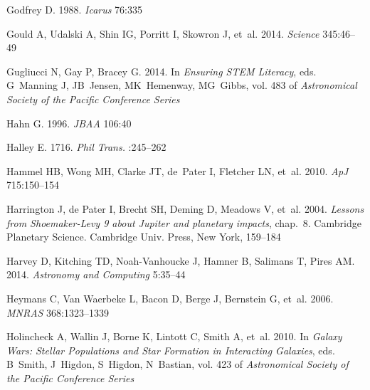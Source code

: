 \documentclass{ar2e}
\def\mnras{MNRAS}
\begin{document}
\begin{thebibliography}{}
{Godfrey} D. 1988.
\newblock \textit{{Icarus}} 76:335

{Gould} A, {Udalski} A, {Shin} IG, {Porritt} I, {Skowron} J, et~al. 2014.
\newblock \textit{Science} 345:46--49

{Gugliucci} N, {Gay} P, {Bracey} G. 2014.
\newblock In \textit{Ensuring STEM Literacy}, eds. G~{Manning} J, JB~{Jensen},
  MK~{Hemenway}, MG~{Gibbs}, vol. 483 of \textit{Astronomical Society of the
  Pacific Conference Series}

{Hahn} G. 1996.
\newblock \textit{{JBAA}} 106:40

{Halley} E. 1716.
\newblock \textit{Phil Trans.} :245--262

Hammel HB, Wong MH, Clarke JT, de~Pater I, Fletcher LN, et~al. 2010.
\newblock \textit{ApJ} 715:150--154

{Harrington} J, {de Pater} I, {Brecht} SH, {Deming} D, {Meadows} V, et~al.
  2004.
\newblock \textit{{Lessons from Shoemaker-Levy 9 about Jupiter and planetary
  impacts}}, chap.~8.
\newblock Cambridge Planetary Science. Cambridge Univ. Press, New York,
  159--184

{Harvey} D, {Kitching} TD, {Noah-Vanhoucke} J, {Hamner} B, {Salimans} T,
  {Pires} AM. 2014.
\newblock \textit{Astronomy and Computing} 5:35--44

{Heymans} C, {Van Waerbeke} L, {Bacon} D, {Berge} J, {Bernstein} G, et~al.
  2006.
\newblock \textit{\mnras} 368:1323--1339

{Holincheck} A, {Wallin} J, {Borne} K, {Lintott} C, {Smith} A, et~al. 2010.
\newblock In \textit{Galaxy Wars: Stellar Populations and Star Formation in
  Interacting Galaxies}, eds. B~{Smith}, J~{Higdon}, S~{Higdon}, N~{Bastian},
  vol. 423 of \textit{Astronomical Society of the Pacific Conference Series}


\end{thebibliography}
\end{document}
